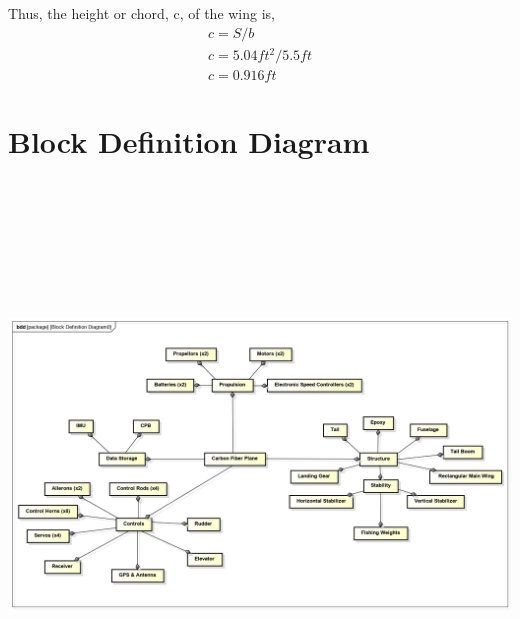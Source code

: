\documentclass[footheight=20pt, footsepline, headheight=20pt, headsepline]{scrartcl}
\begin{document}
Thus, the height or chord, c, of the wing is,
\begin{equation}
\begin{array}{lcl}
c = S/b \\
c = 5.04 ft^2/5.5 ft \\
c = 0.916 ft
\end{array}
\end{equation}
\section{Block Definition Diagram}
\centering
\includegraphics[width=18cm, height=15cm]{image (2).png}
\end{document}
